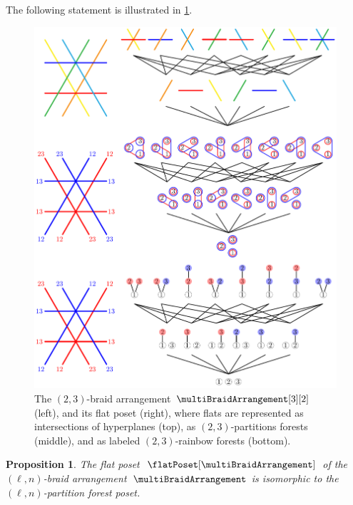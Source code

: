 \documentclass{amsart}
\newtheorem{proposition}[theorem]{Proposition}
\theoremstyle{definition}
\begin{document}
The following statement is illustrated in \cref{fig:intersectionPosetMultiBraidArrangement32}.
%
\begin{figure}
	\centerline{\includegraphics[scale=.9]{figures/intersectionPosetMultiBraidArrangement32Full}}
	\caption{The $(2,3)$-braid arrangement $\multiBraidArrangement[3][2]$ (left), and its flat poset (right), where flats are represented as intersections of hyperplanes (top), as $(2,3)$-partitions forests (middle), and as labeled $(2,3)$-rainbow forests (bottom).}
	\label{fig:intersectionPosetMultiBraidArrangement32}
\end{figure}

\begin{proposition}
\label{prop:flatPosetMultiBraidArrangement}
The flat poset~$\flatPoset[\multiBraidArrangement]$ of the $(\ell,n)$-braid arrangement~$\multiBraidArrangement$ is isomorphic to the $(\ell,n)$-partition forest poset.
\end{proposition}
\end{document}
